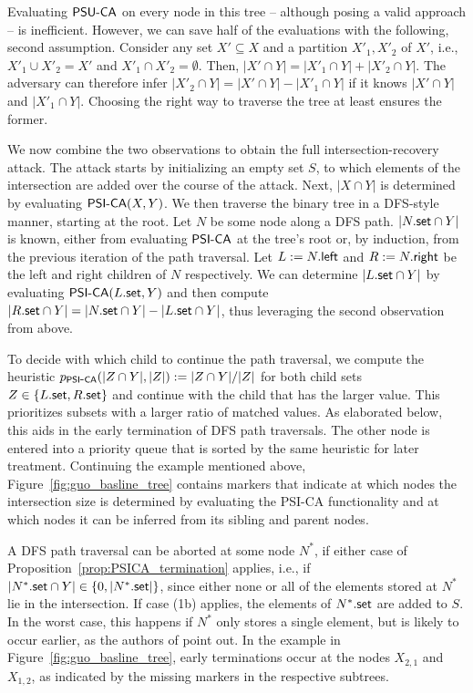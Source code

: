 Evaluating $\mathsf{PSU\mbox{-}CA}$ on every node in this tree -- although posing a valid approach -- is inefficient.
However, we can save half of the evaluations with the following, second assumption.
Consider any set $X'\subseteq X$ and a partition $X'_1, X'_2$ of $X'$, 
i.e., $X'_1 \cup X'_2 = X'$ and $X'_1 \cap X'_2 = \emptyset$.
Then, $|X'\cap Y| = |X'_1 \cap Y| + |X'_2 \cap Y|$.
The adversary can therefore infer $|X'_2 \cap Y| = |X' \cap Y| - |X'_1 \cap Y|$
if it knows $|X'\cap Y|$ and $|X'_1 \cap Y|$.
Choosing the right way to traverse the tree at least ensures the former.


We now combine the two observations to obtain the full intersection-recovery attack.
The attack starts by initializing an empty set $S$, 
to which elements of the intersection are added over the course of the attack.
Next, $|X \cap Y|$ is determined by evaluating $\mathsf{PSI\mbox{-}CA}(X, Y)$.
We then traverse the binary tree in a DFS-style manner, starting at the root. 
Let $N$ be some node along a DFS path.
$|N.\mathsf{set} \cap Y|$ is known, either from evaluating $\mathsf{PSI\mbox{-}CA}{}$ at the tree's root or, 
by induction, from the previous iteration of the path traversal. 
Let $L := N.\mathsf{left}$ and $R := N.\mathsf{right}$ be the left and right children of $N$ respectively.
We can determine $|L.\mathsf{set} \cap Y|$ by evaluating $\mathsf{PSI\mbox{-}CA}(L.\mathsf{set}, Y)$ and then
compute $|R.\mathsf{set} \cap Y| = |N.\mathsf{set} \cap Y| - |L.\mathsf{set} \cap Y|$, 
thus leveraging the second observation from above.

To decide with which child to continue the path traversal, 
we compute the heuristic $p_{\mathsf{PSI\mbox{-}CA}}(|Z \cap Y|, |Z|) := |Z\cap Y| / |Z|$ 
for both child sets $Z \in \{L.\mathsf{set}, R.\mathsf{set}\}$ 
and continue with the child that has the larger value.
This prioritizes subsets with a larger ratio of matched values.
As elaborated below, this aids in the early termination of DFS path traversals. 
The other node is entered into a priority queue that is sorted by the same heuristic for later treatment.
Continuing the example mentioned above, Figure~\ref{fig:guo_basline_tree} contains markers that indicate at which nodes
the intersection size is determined by evaluating the PSI-CA functionality and at which nodes
it can be inferred from its sibling and parent nodes.

A DFS path traversal can be aborted at some node $N^*$, if either case of Proposition~\ref{prop:PSICA_termination} applies, i.e.,
if $|N^*.\mathsf{set} \cap Y| \in \{0, |N^*.\mathsf{set}|\}$,
since either none or all of the elements stored at $N^*$ lie in the intersection. 
If case (1b) applies, the elements of $N^*.\mathsf{set}$ are added to $S$.
In the worst case, this happens if $N^*$ only stores a single element, 
but is likely to occur earlier, as the authors of \cite{USENIX:GHLWJL22} point out.
In the example in Figure~\ref{fig:guo_basline_tree}, early terminations occur at the nodes $X_{2, 1}$ and $X_{1,2}$,
as indicated by the missing markers in the respective subtrees.


